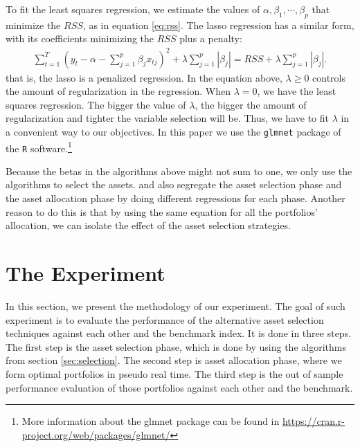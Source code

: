 \documentclass[preprint,authoryear,review,12pt]{elsarticle}
\begin{document}
To fit the least squares regression, we estimate the values of $\alpha, \beta_1, \cdots, \beta_p$ that minimize the $RSS$, as in equation \eqref{eq:rss}.
The lasso regression has a similar form, with its coefficients minimizing the $RSS$ plus a penalty: 
\begin{align} \label{lasso-reg} %
\sum_{t=1}^{T} 
\left( y_t - \alpha - \sum_{j=1}^{p} \beta_j x_{tj} \right)^2 +
\lambda \sum_{j=1}^{p} |\beta_{j}| =
	RSS + 
	\lambda \sum_{j=1}^{p} |\beta_{j}| .
\end{align}
that is, the lasso is a penalized regression.
In the equation above, $\lambda \geq 0$ controls the amount of regularization in the regression.
When $\lambda = 0$, we have the least squares regression.
The bigger the value of $\lambda$, the bigger the amount of regularization and tighter the variable selection will be.
Thus, we have to fit $\lambda$ in a convenient way to our objectives.
In this paper we use the \texttt{glmnet} package of the \texttt{R} software.\footnote{More information about the glmnet package can be found in \url{https://cran.r-project.org/web/packages/glmnet/}}

Because the betas in the algorithms above might not sum to one, we only use the algorithms to select the assets.
\cite{nnl14} and \cite{nnen14} also segregate the asset selection phase and the asset allocation phase by doing different regressions for each phase.
Another reason to do this is that by using the same equation for all the portfolios' allocation, we can isolate the effect of the asset selection strategies.

\section{The Experiment} \label{sec:experiment}

In this section, we present the methodology of our experiment.
The goal of such experiment is to evaluate the performance of the alternative asset selection techniques against each other and the benchmark index.
It is done in three steps.
The first step is the asset selection phase, which is done by using the algorithms from section \ref{sec:selection}.
The second step is asset allocation phase, where we form optimal portfolios in pseudo real time.
The third step is the out of sample performance evaluation of those portfolios against each other and the benchmark.
\end{document}
